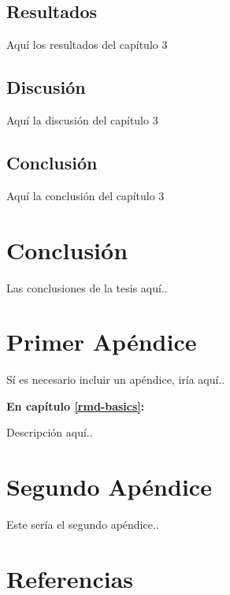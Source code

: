 \documentclass[12pt,oneside]{reedthesis}
\begin{document}
\section{Resultados}\label{resultados-2}

Aquí los resultados del capítulo 3

\section{Discusión}\label{discusiuxf3n-2}

Aquí la discusión del capítulo 3

\section{Conclusión}\label{conclusiuxf3n-2}

Aquí la conclusión del capítulo 3\\

\hfill\break

\chapter*{Conclusión}\label{conclusiuxf3n-3}

Las conclusiones de la tesis aquí..

\appendix

\chapter{Primer Apéndice}\label{primer-apuxe9ndice}

Sí es necesario incluir un apéndice, iría aquí..

\textbf{En capítulo \ref{rmd-basics}:}

Descripción aquí..

\chapter{Segundo Apéndice}\label{segundo-apuxe9ndice}

Este sería el segundo apéndice..

\backmatter

\chapter*{Referencias}\label{referencias}

\printbibliography[heading=none]


\noindent

\setlength{\parindent}{-0.20in}


\end{document}
